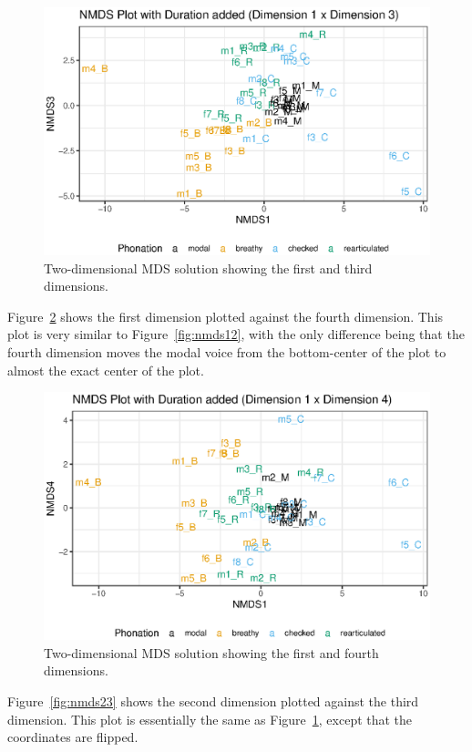 \begin{figure}[!h]
    \centering
    \includegraphics[width = 0.9\linewidth]{images/MDS/nmds13_dur.eps}
    \caption{Two-dimensional MDS solution showing the first and third dimensions.}
    \label{fig:nmds13}
\end{figure}

Figure~\ref{fig:nmds14} shows the first dimension plotted against the fourth dimension. This plot is very similar to Figure~\ref{fig:nmds12}, with the only difference being that the fourth dimension moves the modal voice from the bottom-center of the plot to almost the exact center of the plot.

\begin{figure}[h!]
    \centering
    \includegraphics[width = 0.9\linewidth]{images/MDS/nmds14_dur.eps}
    \caption{Two-dimensional MDS solution showing the first and fourth dimensions.}
    \label{fig:nmds14}
\end{figure}

Figure~\ref{fig:nmds23} shows the second dimension plotted against the third dimension. This plot is essentially the same as Figure~\ref{fig:nmds13}, except that the coordinates are flipped.

